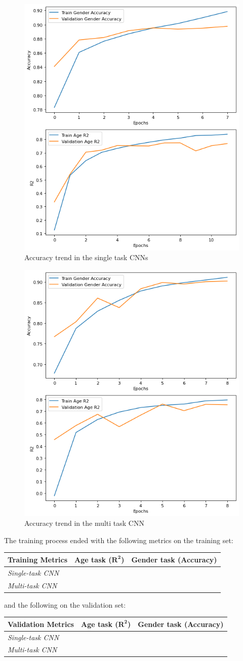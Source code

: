 \begin{figure}[htbp]
    \centerline{\includegraphics[width=.45\textwidth]{images/training/acc-single.png}}
    \caption{Accuracy trend in the single task CNNs}
    \label{4acc}
\end{figure}
\begin{figure}[htbp]
    \centerline{\includegraphics[width=.45\textwidth]{images/training/acc-multi.png}}
    \caption{Accuracy trend in the multi task CNN}
    \label{5acc}
\end{figure}

The training process ended with the following metrics on the training set:
\begin{table}[H]
    \centering
    \begin{tabular}{@{}lll@{}}
    \toprule
    Training Metrics & \textbf{Age task ($\mathbf{R^2}$)} & \textbf{Gender task (Accuracy)} \\ \midrule
    \textit{Single-task CNN} &                   &                      \\
    \textit{Multi-task CNN}  &                   &                      \\ \bottomrule
    \end{tabular}
\end{table}
and the following on the validation set:
\begin{table}[H]
    \centering
    \begin{tabular}{@{}lll@{}}
    \toprule
    Validation Metrics & \textbf{Age task ($\mathbf{R^2}$)} & \textbf{Gender task (Accuracy)} \\ \midrule
    \textit{Single-task CNN} &                   &                      \\
    \textit{Multi-task CNN}  &                   &                      \\ \bottomrule
    \end{tabular}
\end{table}


